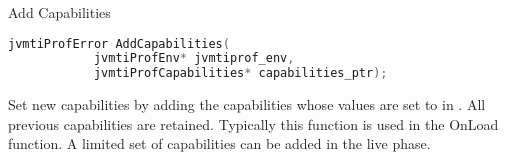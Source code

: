 \begin{apidef}{Add Capabilities}
\begin{lstlisting}[language=C]
jvmtiProfError AddCapabilities(
            jvmtiProfEnv* jvmtiprof_env,
            jvmtiProfCapabilities* capabilities_ptr);
\end{lstlisting}

\begin{apidesc}
Set new capabilities by adding the capabilities whose values are set to  in . All previous capabilities are retained. Typically this function is used in the OnLoad function. A limited set of capabilities can be added in the live phase. 
\end{apidesc}

\begin{apiphase}
\apiphaseonloadlive
\end{apiphase}

\begin{apicap}
\apicaprequired
\end{apicap}

\begin{apiparam}
\end{apiparam}

\apireturnempty

\begin{apierror}
\end{apierror}
\end{apidef}
